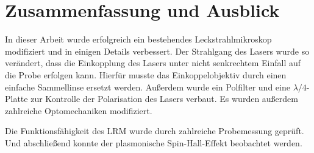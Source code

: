 \documentclass[titlepage,  ngerman]{article}
\begin{document}
	

	\newpage
	\section{Zusammenfassung und Ausblick}
	In dieser Arbeit wurde erfolgreich ein bestehendes Leckstrahlmikroskop modifiziert und in einigen Details verbessert.	Der Strahlgang des Lasers wurde so verändert, dass die Einkopplung des Lasers unter nicht senkrechtem Einfall auf die Probe erfolgen kann. Hierfür musste das Einkoppelobjektiv durch einen einfache Sammellinse ersetzt werden. Außerdem wurde ein Polfilter und eine $\lambda/4$-Platte zur Kontrolle der Polarisation des Lasers verbaut. Es wurden außerdem zahlreiche Optomechaniken modifiziert.
	
	Die Funktionsfähigkeit des LRM wurde durch zahlreiche Probemessung geprüft. Und abschließend konnte der plasmonische Spin-Hall-Effekt beobachtet werden. 
	
	
	\newpage
	\appendix
	
\end{document}
